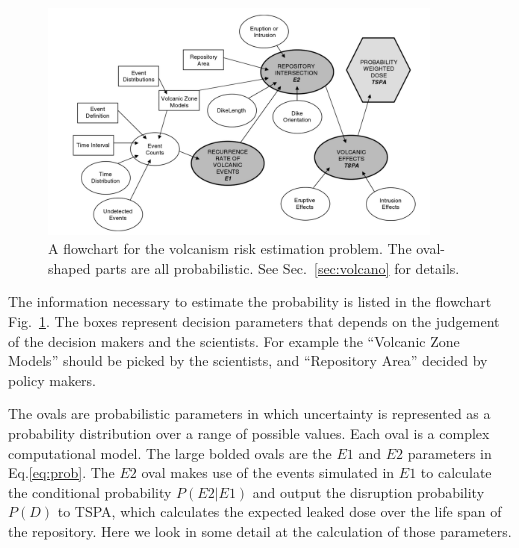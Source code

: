 \documentclass[nofootinbib,preprint,aip,pra]{revtex4-1}
\begin{document}
        \begin{figure}[h]
            \label{fig:volcano}
            \centering
            \includegraphics[width=0.9\textwidth]{volcano.png}
            \caption{A flowchart for the volcanism risk estimation problem. The oval-shaped
            parts are all probabilistic. See Sec.~\ref{sec:volcano} for details.\cite{me06}}
        \end{figure}

        The information necessary to estimate the probability is listed in the flowchart Fig.~\ref{fig:volcano}.
        The boxes represent decision parameters that depends on the judgement of the decision makers and
        the scientists. For example the ``Volcanic Zone Models'' should be picked by the scientists, and
        ``Repository Area'' decided by policy makers.
        
        The ovals are probabilistic parameters in which uncertainty
        is represented as a probability distribution over a range of possible values.
        Each oval is a complex computational model.
        The large bolded ovals are the $E1$ and $E2$ parameters in Eq.\ref{eq:prob}.
        The $E2$ oval makes
        use of the events simulated in $E1$ to calculate the conditional probability $P(E2|E1)$ and output
        the disruption probability $P(D)$ to TSPA, which calculates the expected leaked dose over the
        life span of the repository. Here we look in some detail at the calculation of those parameters.
\end{document}
